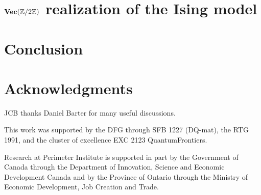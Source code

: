 \section{$\textbf{Vec}(\mathbb{Z}/2\mathbb{Z})$ realization of the Ising model}



\section{Conclusion}
\label{Conclusion}

\section*{Acknowledgments}
JCB thanks Daniel Barter for many useful discussions.

This work was supported by the DFG through SFB 1227 (DQ-mat), the RTG 1991, and the cluster of excellence EXC 2123 QuantumFrontiers.

Research at Perimeter Institute is supported in part by the Government of Canada through the Department of Innovation, Science and Economic Development Canada and by the Province of Ontario through the Ministry of Economic Development, Job Creation and Trade.



